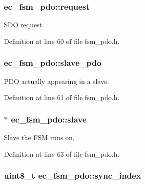 \subsubsection[{request}]{ {\bf ec\-\_\-fsm\-\_\-pdo\-::request}}\label{structec__fsm__pdo_a437105cab7019aad6aed6d5cf6326e4a}


\-S\-D\-O request. 



\-Definition at line 60 of file fsm\-\_\-pdo.\-h.

\subsubsection[{slave\-\_\-pdo}]{ {\bf ec\-\_\-fsm\-\_\-pdo\-::slave\-\_\-pdo}}\label{structec__fsm__pdo_a83ce3aec31b10b4941c60088ac1c4a10}


\-P\-D\-O actually appearing in a slave. 



\-Definition at line 61 of file fsm\-\_\-pdo.\-h.

\subsubsection[{slave}]{$\ast$ {\bf ec\-\_\-fsm\-\_\-pdo\-::slave}}\label{structec__fsm__pdo_a659ca1e17ea96e9be327dd65eea054e4}


\-Slave the \-F\-S\-M runs on. 



\-Definition at line 63 of file fsm\-\_\-pdo.\-h.

\subsubsection[{sync\-\_\-index}]{\setlength{\rightskip}{0pt plus 5cm}uint8\-\_\-t {\bf ec\-\_\-fsm\-\_\-pdo\-::sync\-\_\-index}}\label{structec__fsm__pdo_a8b69e76c8f517ca1d7e8d782122ce7b8}


